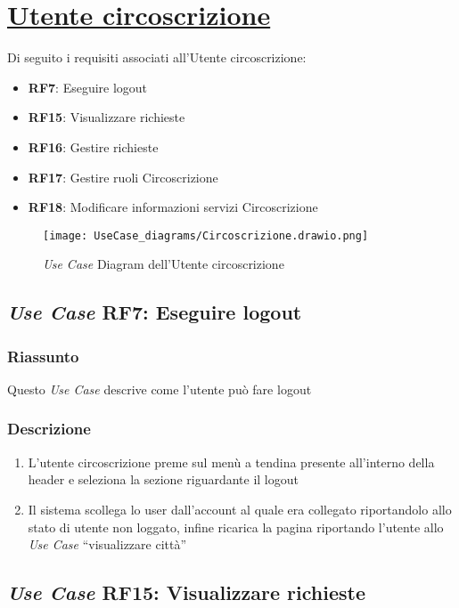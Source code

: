 \section{\underline{Utente circoscrizione}}
    Di seguito i requisiti associati all'Utente circoscrizione:
    \begin{itemize}
        \item \textbf{RF7}: Eseguire logout
        \item \textbf{RF15}: Visualizzare richieste
        \item \textbf{RF16}: Gestire richieste
        \item \textbf{RF17}: Gestire ruoli Circoscrizione
        \item \textbf{RF18}: Modificare informazioni servizi Circoscrizione
    \end{itemize}
    \begin{figure}[H]
        \centering
        \texttt{[image: UseCase\_diagrams/Circoscrizione.drawio.png]}
        \caption{\textit{Use Case} Diagram dell'Utente circoscrizione}
    \end{figure}

    \subsection{\textit{Use Case} RF7: Eseguire logout}
        \subsubsection{Riassunto}
            Questo \textit{Use Case} descrive come l'utente può fare logout
        \subsubsection{Descrizione}
            \begin{enumerate}
                \item L'utente circoscrizione preme sul menù a tendina presente all'interno della header e seleziona la sezione riguardante il logout
                \item Il sistema scollega lo user dall'account al quale era collegato riportandolo allo stato di utente non loggato, infine 
                ricarica la pagina riportando l'utente allo \textit{Use Case} ``visualizzare città''
            \end{enumerate}

    \subsection{\textit{Use Case} RF15: Visualizzare richieste}

